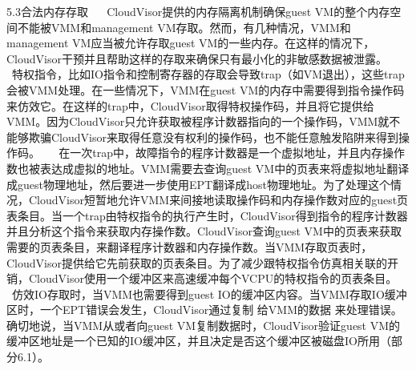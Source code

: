 5.3合法内存存取
   CloudVisor提供的内存隔离机制确保guest VM的整个内存空间不能被VMM和management VM存取。然而，有几种情况，VMM和management VM应当被允许存取guest VM的一些内存。在这样的情况下，CloudVisor干预并且帮助这样的存取来确保只有最小化的非敏感数据被泄露。
   特权指令，比如IO指令和控制寄存器的存取会导致trap（如VM退出），这些trap会被VMM处理。在一些情况下，VMM在guest VM的内存中需要得到指令操作码来仿效它。在这样的trap中，CloudVisor取得特权操作码，并且将它提供给VMM。因为CloudVisor只允许获取被程序计数器指向的一个操作码，VMM就不能够欺骗CloudVisor来取得任意没有权利的操作码，也不能任意触发陷阱来得到操作码。
   在一次trap中，故障指令的程序计数器是一个虚拟地址，并且内存操作数也被表达成虚拟的地址。VMM需要去查询guest VM中的页表来将虚拟地址翻译成guest物理地址，然后要进一步使用EPT翻译成host物理地址。为了处理这个情况，CloudVisor短暂地允许VMM来间接地读取操作码和内存操作数对应的guest页表条目。当一个trap由特权指令的执行产生时，CloudVisor得到指令的程序计数器并且分析这个指令来获取内存操作数。CloudVisor查询guest VM中的页表来获取需要的页表条目，来翻译程序计数器和内存操作数。当VMM存取页表时，CloudVisor提供给它先前获取的页表条目。为了减少跟特权指令仿真相关联的开销，CloudVisor使用一个缓冲区来高速缓冲每个VCPU的特权指令的页表条目。
   仿效IO存取时，当VMM也需要得到guest IO的缓冲区内容。当VMM存取IO缓冲区时，一个EPT错误会发生，CloudVisor通过复制 给VMM的数据 来处理错误。确切地说，当VMM从或者向guest VM复制数据时，CloudVisor验证guest VM的缓冲区地址是一个已知的IO缓冲区，并且决定是否这个缓冲区被磁盘IO所用（部分6.1）。

\fi
















